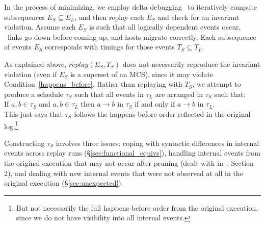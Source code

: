 In the process of minimizing, we employ delta debugging~\cite{Zeller:1999:YMP:318773.318946}
to iteratively compute
subsequences $E_S\subseteq E_L$, and then replay each $E_S$ and check for an
invariant violation. Assume each $E_S$ is such
that all logically dependent events occur, \eg~links go down before coming up,
and hosts migrate correctly. Each subsequence of events $E_S$ corresponds with
timings for those events $T_S\subseteq T_L$.

As explained above, $replay(E_S, T_S)$ does not necessarily reproduce the
invariant violation (even if $E_S$ is a superset of an MCS), since it may
violate Condition~\ref{happens_before}. Rather than replaying with $T_S$, we attempt to produce a
schedule $\tau_S$ such that all events in $\tau_L$ are arranged in $\tau_S$
such that: \\

If $a, b\in \tau_S$ and $a, b\in \tau_L$ then $a \rightarrow b$ in $\tau_S$ if
and only if $a \rightarrow b$ in $\tau_L$. \\

\noindent This just says that $\tau_S$ follows the happens-before order reflected in the
original log.\footnote{But not necessarily the full happens-before order from
the original execution, since we do not have visibility into all internal
events.}

Constructing $\tau_S$ involves three issues: coping with syntactic differences in internal
events across replay runs (\S\ref{sec:functional_equivs}),
handling internal events from the original
execution that may not occur after pruning (dealt with in~\cite{sts}, Section 2),
and dealing with new internal events that were not
observed at all in the original execution (\S\ref{sec:unexpected}).

